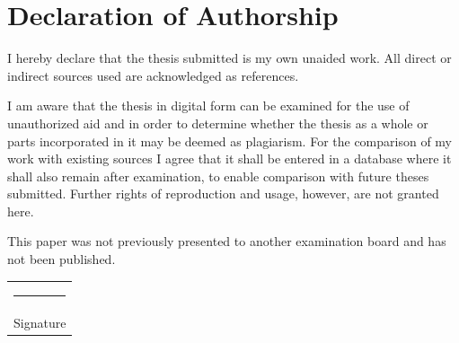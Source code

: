\chapter*{Declaration of Authorship}

I hereby declare that the thesis submitted is my own unaided work. All direct or indirect
sources used are acknowledged as references.
\par
I am aware that the thesis in digital form can be examined for the use of unauthorized aid
and in order to determine whether the thesis as a whole or parts incorporated in it may be
deemed as plagiarism. For the comparison of my work with existing sources I agree that it
shall be entered in a database where it shall also remain after examination, to enable
comparison with future theses submitted. Further rights of reproduction and usage, however,
are not granted here.
\par
This paper was not previously presented to another examination board and has not been
published.
\begin{flushright}
\hspace{10cm}
\begin{tabular}{p{2.5in}}
        \rule{6cm}{0.4pt}   \\
        Signature           \\
\end{tabular}
\end{flushright}